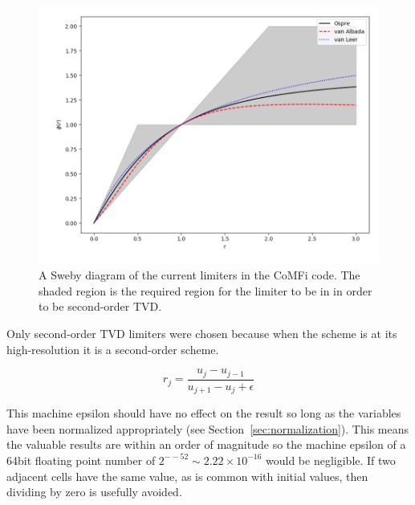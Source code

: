 \documentclass[12pt,upcase]{umlthesis}
\begin{document}
\begin{figure}[h!]\label{fig:sweby}
	\centering
	\includegraphics[width=1.0\linewidth]{images/sweby.png}
	\caption{A Sweby diagram of the current limiters in the CoMFi code. The shaded region is the required region for the limiter to be in in order to be second-order TVD\@.}
\end{figure}

Only second-order TVD limiters were chosen because when the scheme is at its high-resolution it is a second-order scheme.


\begin{equation}
	r_j = \frac{u_j - u_{j-1}}{u_{j+1} - u_j + \epsilon}
\end{equation}

This machine epsilon should have no effect on the result so long as the variables have been normalized appropriately (see Section~\ref{sec:normalization}). This means the valuable results are within an order of magnitude so the machine epsilon of a 64bit floating point number of $2^{-−52} \sim 2.22 \times 10^{-16}$ would be negligible. If two adjacent cells have the same value, as is common with initial values, then dividing by zero is usefully avoided.
\end{document}
